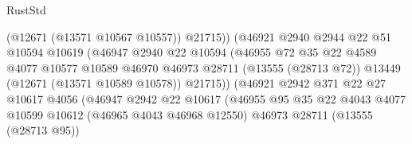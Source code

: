 \begin{lexlean}{RustStd}
\begin{coremodule}
                                          (@12671 (@13571 @10567 @10557))
                                          @21715))
                                      (@46921
                                        @2940
                                        @2944
                                        @22
                                        @51
                                        @10594
                                        @10619
                                        (@46947
                                          @2940
                                          @22
                                          @10594
                                          (@46955
                                            @72
                                            @35
                                            @22
                                            @4589
                                            @4077
                                            @10577
                                            @10589
                                            @46970
                                            @46973
                                            @28711
                                            (@13555 (@28713 @72))
                                            @13449
                                            (@12671 (@13571 @10589 @10578))
                                            @21715))
                                        (@46921
                                          @2942
                                          @371
                                          @22
                                          @27
                                          @10617
                                          @4056
                                          (@46947
                                            @2942
                                            @22
                                            @10617
                                            (@46955
                                              @95
                                              @35
                                              @22
                                              @4043
                                              @4077
                                              @10599
                                              @10612
                                              (@46965 @4043 @46968 @12550)
                                              @46973
                                              @28711
                                              (@13555 (@28713 @95))

\end{coremodule}
\end{lexlean}

